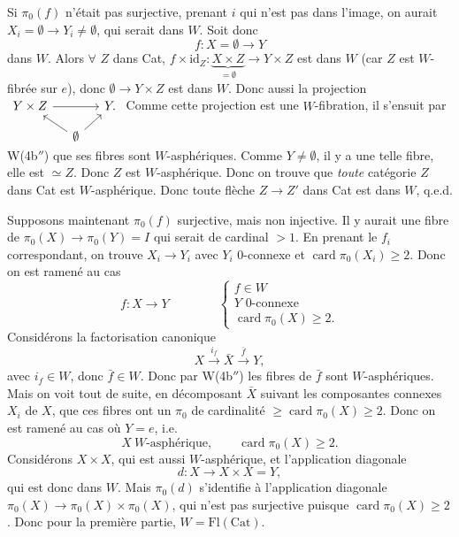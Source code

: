 \documentclass[11pt]{article}
\newcommand{\printedpage}[1]{\marginpar{\footnotesize p.~#1}}
\newcommand{\msp}[1]{\marginpar{\footnotesize [#1]}}
\newcommand{\Cat}{\mathrm{Cat}}
\newcommand{\Fl}{\mathrm{Fl}}
\newcommand{\card}{\operatorname{card}}
\begin{document}
Si $\pi_0(f)$ n'était pas surjective, prenant $i$ qui n'est pas dans l'image, on aurait $X_i = \emptyset \longrightarrow Y_i \neq \emptyset$, qui serait dans $W$. Soit donc
\[
f : X = \emptyset \longrightarrow Y
\]
dans $W$. Alors $\forall$ $Z$ dans Cat, $f \times \mathrm{id}_Z : \underbrace{X \times Z}_{= \emptyset} \longrightarrow Y \times Z$ est dans $W$ (car $Z$ est
\printedpage{18}
$W$-fibrée sur $e$), donc $\emptyset \longrightarrow Y \times Z$ est dans $W$. Donc aussi la projection
$\begin{tikzcd}[column sep=small, row sep=small, baseline=(\tikzcdmatrixname-1-1.base)]
Y \times Z \arrow[rr] & & Y. \\
& \emptyset \arrow[ul] \arrow[ur] &
\end{tikzcd}$
Comme cette projection est une $W$-fibration, il s'ensuit par W(4b$''$) que ses fibres sont $W$-asphériques. Comme $Y \neq \emptyset$, il y a une telle fibre, elle est $\simeq Z$. Donc $Z$ est $W$-asphérique. Donc on trouve que \textit{toute} catégorie $Z$ dans Cat est $W$-asphérique. Donc toute flèche $Z \longrightarrow Z'$ dans Cat est dans $W$, q.e.d.

Supposons maintenant $\pi_0(f)$ surjective, mais non injective. Il y aurait une fibre de $\pi_0(X) \longrightarrow \pi_0(Y) = I$ qui serait de cardinal $> 1$. En prenant le $f_i$ correspondant, on trouve $X_i \longrightarrow Y_i$ avec $Y_i$ 0-connexe et $\card \pi_0(X_i) \geq 2$. Donc on est ramené au cas
\[
f : X \longrightarrow Y \qquad\qquad \left\{
\begin{array}{l}
f \in W \\[1ex]
Y \text{ 0-connexe} \\[1ex]
\card \pi_0(X) \geq 2.
\end{array}
\right.
\]
Considérons la factorisation canonique
\[
X \xrightarrow{i_f} \bar{X} \xrightarrow{\bar{f}} Y,
\]
avec $i_f \in W$, donc $\bar{f} \in W$. Donc par W(4b$''$) les fibres de $\bar{f}$ sont $W$-asphériques. Mais on voit tout de suite, en décomposant $\bar{X}$ suivant les composantes connexes $X_i$ de $X$, que ces fibres ont un $\pi_0$ de cardinalité $\geq \card \pi_0(X) \geq 2$. Donc on est ramené au cas où $Y = e$, i.e.
\[
X \ W\text{-asphérique}, \qquad \card \pi_0(X) \geq 2.
\]
Considérons $X \times X$, qui est aussi $W$-asphérique, et l'application diagonale\msp{page 22}
\[
d : X \longrightarrow X \times X = Y,
\]
qui est donc dans $W$. Mais $\pi_0(d)$ s'identifie à l'application diagonale $\pi_0(X) \longrightarrow \pi_0(X) \times \pi_0(X)$, qui n'est pas surjective puisque $\card \pi_0(X) \geq 2$. Donc pour la première partie, $W = \Fl(\Cat)$.
\end{document}
